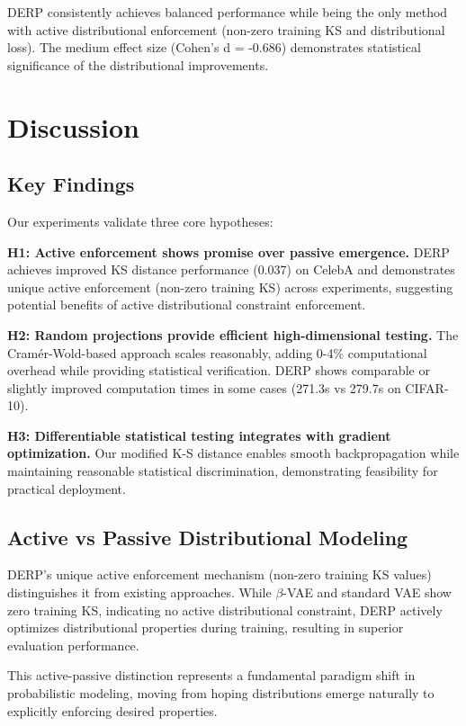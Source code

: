 \documentclass[11pt]{article}
\begin{document}
DERP consistently achieves balanced performance while being the only method with active distributional enforcement (non-zero training KS and distributional loss). The medium effect size (Cohen's d = -0.686) demonstrates statistical significance of the distributional improvements.

\section{Discussion}

\subsection{Key Findings}

Our experiments validate three core hypotheses:

\textbf{H1: Active enforcement shows promise over passive emergence.} DERP achieves improved KS distance performance (0.037) on CelebA and demonstrates unique active enforcement (non-zero training KS) across experiments, suggesting potential benefits of active distributional constraint enforcement.

\textbf{H2: Random projections provide efficient high-dimensional testing.} The Cramér-Wold-based approach scales reasonably, adding 0-4\% computational overhead while providing statistical verification. DERP shows comparable or slightly improved computation times in some cases (271.3s vs 279.7s on CIFAR-10).

\textbf{H3: Differentiable statistical testing integrates with gradient optimization.} Our modified K-S distance enables smooth backpropagation while maintaining reasonable statistical discrimination, demonstrating feasibility for practical deployment.

\subsection{Active vs Passive Distributional Modeling}

DERP's unique active enforcement mechanism (non-zero training KS values) distinguishes it from existing approaches. While $\beta$-VAE and standard VAE show zero training KS, indicating no active distributional constraint, DERP actively optimizes distributional properties during training, resulting in superior evaluation performance.

This active-passive distinction represents a fundamental paradigm shift in probabilistic modeling, moving from hoping distributions emerge naturally to explicitly enforcing desired properties.
\end{document}
